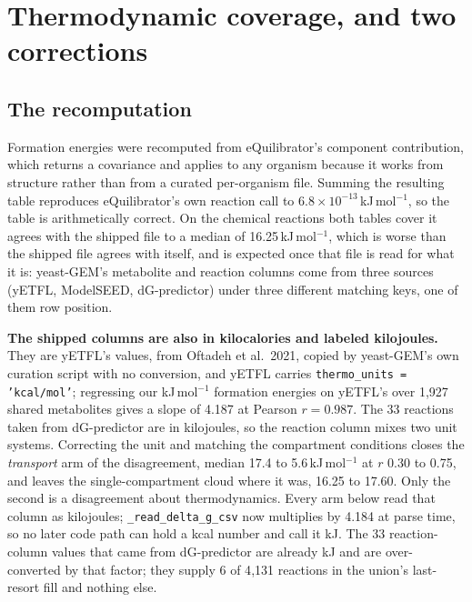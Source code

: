 
\section{Thermodynamic coverage, and two corrections}
\label{sec:coverage}

\subsection{The recomputation}

Formation energies were recomputed from eQuilibrator's component contribution, which
returns a covariance and applies to any organism because it works from structure rather
than from a curated per-organism file. Summing the resulting table reproduces
eQuilibrator's own reaction call to $6.8\times10^{-13}$\,kJ\,mol$^{-1}$, so the table is
arithmetically correct. On the chemical reactions both tables cover it agrees with the
shipped file to a median of 16.25\,kJ\,mol$^{-1}$, which is worse than the shipped file
agrees with itself, and is expected once that file is read for what it is: yeast-GEM's
metabolite and reaction columns come from three sources (yETFL, ModelSEED, dG-predictor)
under three different matching keys, one of them row position.

\textbf{The shipped columns are also in kilocalories and labeled kilojoules.} They are
yETFL's values, from Oftadeh et al.\ 2021, copied by yeast-GEM's own curation script with
no conversion, and yETFL carries \texttt{thermo\_units = 'kcal/mol'};
regressing our kJ\,mol$^{-1}$ formation energies on yETFL's over 1{,}927 shared metabolites
gives a slope of 4.187 at Pearson $r = 0.987$. The 33 reactions taken from dG-predictor are
in kilojoules, so the reaction column mixes two unit systems. Correcting the unit and
matching the compartment conditions closes the \emph{transport} arm of the disagreement,
median 17.4 to 5.6\,kJ\,mol$^{-1}$ at $r$ 0.30 to 0.75, and leaves the single-compartment
cloud where it was, 16.25 to 17.60. Only the second is a disagreement about thermodynamics.
Every arm below read that column as kilojoules; \texttt{\_read\_delta\_g\_csv} now
multiplies by 4.184 at parse time, so no later code path can hold a kcal number and call it
kJ. The 33 reaction-column values that came from dG-predictor are already kJ and are
over-converted by that factor; they supply 6 of 4{,}131 reactions in the union's
last-resort fill and nothing else.

